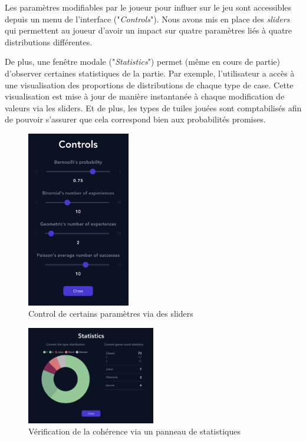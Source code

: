 \documentclass[a4paper, 12pt]{report}
\begin{document}
\vspace{0.5cm}

\tabto{1cm}Les paramètres modifiables par le joueur pour influer sur le jeu sont accessibles depuis un menu de l'interface ("\textit{Controls}").
Nous avons mis en place des \textit{sliders} qui permettent au joueur d'avoir un impact sur quatre paramètres liés à quatre distributions différentes.

\tabto{1cm}De plus, une fenêtre modale ("\textit{Statistics}") permet (même en cours de partie) d'observer certaines statistiques de la partie. Par exemple, 
l'utilisateur a accès à une visualisation des proportions de distributions de chaque type de case. Cette visualisation est mise 
à jour de manière instantanée à chaque modification de valeurs via les sliders. Et de plus, les types de tuiles jouées sont comptabilisés afin 
de pouvoir s'assurer que cela correspond bien aux probabilités promises.

\begin{figure}[!t]
\centering
\includegraphics[width=0.4\textwidth]{images/2048-revisited-version-controls.jpg}
\caption{Control de certains paramètres via des sliders}
\label{Controls}
\end{figure}

\begin{figure}[!t]
\centering
\includegraphics[width=0.5\textwidth]{images/2048-revisited-version-statistics.jpg}
\caption{Vérification de la cohérence via un panneau de statistiques}
\label{Statistics}
\end{figure}
\end{document}
